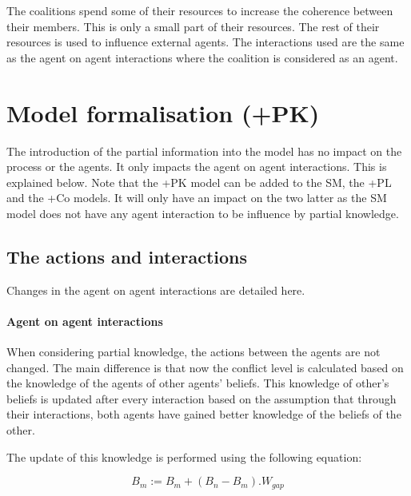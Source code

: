 \documentclass[11pt]{article}
\begin{document}
The coalitions spend some of their resources to increase the coherence between their members. This is only a small part of their resources. The rest of their resources is used to influence external agents. The interactions used are the same as the agent on agent interactions where the coalition is considered as an agent.



\section{Model formalisation (+PK)}

The introduction of the partial information into the model has no impact on the process or the agents. It only impacts the agent on agent interactions. This is explained below. Note that the +PK model can be added to the SM, the +PL and the +Co models. It will only have an impact on the two latter as the SM model does not have any agent interaction to be influence by partial knowledge.

\subsection{The actions and interactions}

Changes in the agent on agent interactions are detailed here.

\paragraph{Agent on agent interactions}

When considering partial knowledge, the actions between the agents are not changed. The main difference is that now the conflict level is calculated based on the knowledge of the agents of other agents' beliefs. This knowledge of other's beliefs is updated after every interaction based on the assumption that through their interactions, both agents have gained better knowledge of the beliefs of the other.

The update of this knowledge is performed using the following equation:

\begin{equation}
B_{m} := B_{m} + (B_{n} - B_{m}). W_{gap}
\end{equation}
\end{document}
